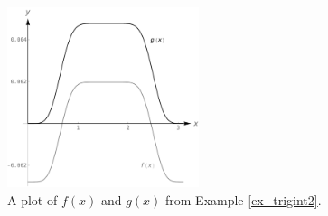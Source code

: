\begin{figure}[h]
	\begin{center}
			\includegraphics[width=0.5\textwidth]{fig_int_12}
	\caption{A plot of $f(x)$ and $g(x)$ from Example \ref{ex_trigint2}.}
	\label{fig_int_12}
	\end{center}
\end{figure}

